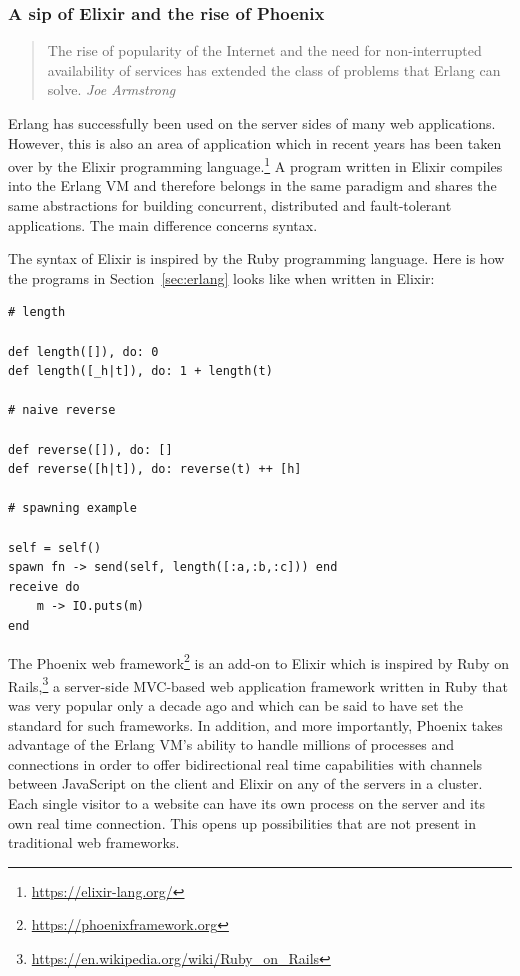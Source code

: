 \subsubsection{A sip of Elixir and the rise of Phoenix}\label{sec:a-sip-of-elixir}

\begin{quotation}
\noindent The rise of popularity of the Internet and the need for non-interrupted availability of services has extended the class of problems that Erlang can solve.
\vspace{-0.3cm}
\flushright\textit{Joe Armstrong}
\vspace{0.3cm}
\end{quotation}

\noindent Erlang has successfully been used on the server sides of many web applications. However, this is also an area of application which in recent years has been taken over by the Elixir programming language.\footnote{\url{https://elixir-lang.org/}} A program written in Elixir compiles into the Erlang VM and therefore belongs in the same paradigm and shares the same abstractions for building concurrent, distributed and fault-tolerant applications. The main difference concerns syntax.

The syntax of Elixir is inspired by the Ruby programming language. Here is how the programs in Section~\ref{sec:erlang} looks like when written in Elixir:

\begin{verbatim}
# length

def length([]), do: 0
def length([_h|t]), do: 1 + length(t)

# naive reverse

def reverse([]), do: []
def reverse([h|t]), do: reverse(t) ++ [h]

# spawning example

self = self()
spawn fn -> send(self, length([:a,:b,:c])) end
receive do
    m -> IO.puts(m)
end
\end{verbatim}

\noindent The Phoenix web framework\footnote{\url{https://phoenixframework.org}} is an add-on to Elixir which is inspired by Ruby on Rails,\footnote{\url{https://en.wikipedia.org/wiki/Ruby_on_Rails}} a server-side MVC-based web application framework written in Ruby that was very popular only a decade ago and which can be said to have set the standard for such frameworks. In addition, and more importantly, Phoenix takes advantage of the Erlang VM's ability to handle millions of processes and connections in order to offer bidirectional real time capabilities with channels between JavaScript on the client and Elixir on any of the servers in a cluster. Each single visitor to a website can have its own process on the server and its own real time connection. This opens up possibilities that are not present in traditional web frameworks.

